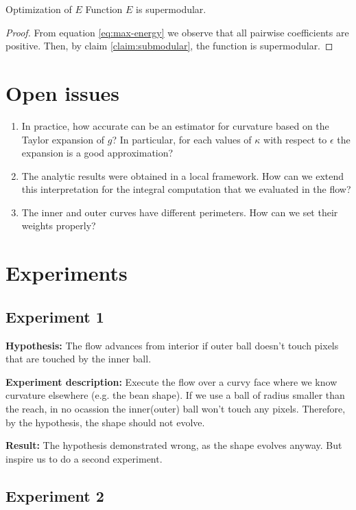 \begin{claim}{Optimization of $E$}
	Function $E$ is supermodular.
\end{claim}

\begin{proof}
	From equation \eqref{eq:max-energy} we observe that all pairwise coefficients are positive. Then, by claim \ref{claim:submodular}, the function is supermodular.
\end{proof}


\section{Open issues}

\begin{enumerate}
	\item{In practice, how accurate can be an estimator for curvature based on the Taylor expansion of $g$? In particular, for each values of $\kappa$ with respect to $\epsilon$ the expansion is a good approximation?}
	\item{The analytic results were obtained in a local framework. How can we extend this interpretation for the integral computation that we evaluated in the flow?}
	\item{The inner and outer curves have different perimeters. How can we set their weights properly?}
\end{enumerate}


\section{Experiments}

\subsection{Experiment 1}
\textbf{Hypothesis:} The flow advances from interior if outer ball doesn't touch pixels that are touched by the inner ball.


\textbf{Experiment description:} Execute the flow over a curvy face where we know curvature elsewhere (e.g. the bean shape). If we use a ball of radius smaller than the reach, in no ocassion the inner(outer) ball won't touch any pixels. Therefore, by the hypothesis, the shape should not evolve.


\textbf{Result:} The hypothesis demonstrated wrong, as the shape evolves anyway. But inspire us to do a second experiment.

\subsection{Experiment 2}


